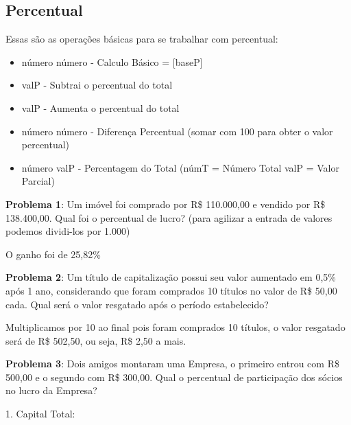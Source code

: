 \subsection*{Percentual}
Essas são as operações básicas para se trabalhar com percentual: \vspace{-1em}
\begin{itemize}
	\item número  número \keystroke{$\%$} - Calculo Básico = [baseP]
	\item valP \keystroke{$-$} - Subtrai o percentual do total
	\item valP \keystroke{$+$} - Aumenta o percentual do total
	\item número  número \keystroke{$\bigtriangleup \%$} - Diferença Percentual (somar com 100 para obter o valor percentual)
	\item número  valP  - Percentagem do Total (númT = Número Total valP = Valor Parcial)
\end{itemize}

\textbf{Problema 1}: Um imóvel foi comprado por R\$ 110.000,00 e vendido por R\$ 138.400,00. Qual foi o percentual de lucro? (para agilizar a entrada de valores podemos dividi-los por 1.000)

         \keystroke{$\bigtriangleup \%$} 

O ganho foi de 25,82\%

\textbf{Problema 2}: Um título de capitalização possui seu valor aumentado em 0,5\% após 1 ano, considerando que foram comprados 10 títulos no valor de R\$ 50,00 cada. Qual será o valor resgatado após o período estabelecido?

      \keystroke{$\%$} \keystroke{$+$}   \keystroke{$\times$}

Multiplicamos por 10 ao final pois foram comprados 10 títulos, o valor resgatado será de R\$ 502,50, ou seja, R\$ 2,50 a mais.

\textbf{Problema 3}: Dois amigos montaram uma Empresa, o primeiro entrou com R\$ 500,00 e o segundo com R\$ 300,00. Qual o percentual de participação dos sócios no lucro da Empresa?

1. Capital Total:         \keystroke{$+$}

